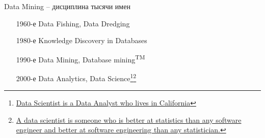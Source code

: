 \documentclass[aspectratio=169]{beamer}
\begin{document}
\begin{frame}{Data Mining -- дисциплина тысячи имен}

\begin{enumerate}
\item[1960-е] Data Fishing, Data Dredging
\item[1980-е] Knowledge Discovery in Databases
\item[1990-е] Data Mining, Database mining\textsuperscript{TM}
\item[2000-е] Data Analytics, Data Science\footnote{\href{https://twitter.com/nivertech/status/180109930139893761}{Data Scientist is a Data Analyst who lives in California}}\footnote{\href{https://twitter.com/josh_wills/status/198093512149958656}{A data scientist is someone who is better at statistics than any software engineer and better at software engineering than any statistician.}\vspace{3em}}
\end{enumerate}

\end{frame}
\end{document}
